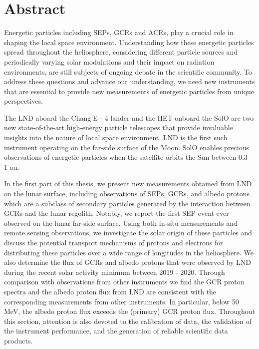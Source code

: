 \chapter*{Abstract}
Energetic particles including \acp{SEP}, \acp{GCR} and \acp{ACR}, play a crucial role in shaping the local space environment. Understanding how these energetic particles spread throughout the heliosphere, considering different particle sources and periodically varying solar modulations and their impact on radiation environments, are still subjects of ongoing debate in the scientific community. To address these questions and advance our understanding, we need new instruments that are essential to provide new measurements of energetic particles from unique perspectives.

The \ac{LND} aboard the Chang'E - 4 lander and the \ac{HET} onboard the \ac{SolO} are two new state-of-the-art high-energy particle telescopes that provide invaluable insights into the nature of local space environment. \ac{LND} is the first such instrument operating on the far-side surface of the Moon. \ac{SolO} enables precious observations of energetic particles when the satellite orbits the Sun between 0.3 - 1 au.

In the first part of this thesis, we present new measurements obtained from \ac{LND} on the lunar surface, including observations of \acp{SEP}, \acp{GCR}, and albedo protons which are a subclass of secondary particles generated by the interaction between \acp{GCR} and the lunar regolith. Notably, we report the first \ac{SEP} event ever observed on the lunar far-side surface. Using both in-situ measurements and remote sensing observations, we investigate the solar origin of these particles and discuss the potential transport mechanisms of protons and electrons for distributing these particles over a wide range of longitudes in the heliosphere. We also determine the flux of \acp{GCR} and albedo protons that were observed by \ac{LND} during the recent solar activity minimum between 2019 - 2020. Through comparison with observations from other instruments
we find the \ac{GCR} proton spectra and the albedo proton flux from \ac{LND} are consistent with the corresponding measurements from other instruments. In particular, below 50 MeV, the albedo proton ﬂux exceeds the (primary) \ac{GCR} proton ﬂux.
Throughout this section, attention is also devoted to the calibration of data, the validation of the instrument performance, and the generation of reliable scientific data products.

